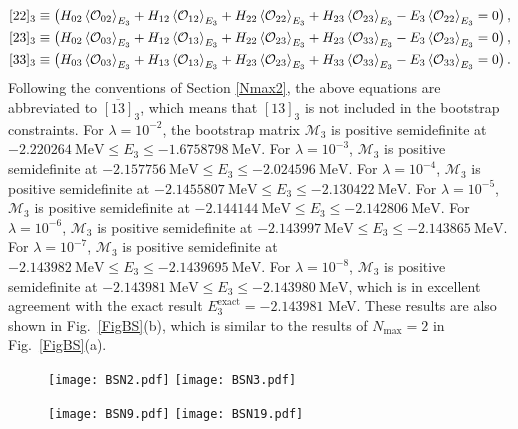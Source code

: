 \documentclass[aps,prc,reprint,superscriptaddress,nofootinbib]{revtex4-2}
\begin{document}
\begin{widetext}
\begin{align}
&[22]_3\equiv \left(H_{02}\braket{\mathcal{O}_{02}}_{E_3}+H_{12}\braket{\mathcal{O}_{12}}_{E_3}+H_{22}\braket{\mathcal{O}_{22}}_{E_3}+H_{23}\braket{\mathcal{O}_{23}}_{E_3}-E_3\braket{\mathcal{O}_{22}}_{E_3}=0\right),\nonumber\\
&[23]_3\equiv \left(H_{02}\braket{\mathcal{O}_{03}}_{E_3}+H_{12}\braket{\mathcal{O}_{13}}_{E_3}+H_{22}\braket{\mathcal{O}_{23}}_{E_3}+H_{23}\braket{\mathcal{O}_{33}}_{E_3}-E_3\braket{\mathcal{O}_{23}}_{E_3}=0\right),\nonumber\\
&[33]_3\equiv \left(H_{03}\braket{\mathcal{O}_{03}}_{E_3}+H_{13}\braket{\mathcal{O}_{13}}_{E_3}+H_{23}\braket{\mathcal{O}_{23}}_{E_3}+H_{33}\braket{\mathcal{O}_{33}}_{E_3}-E_3\braket{\mathcal{O}_{33}}_{E_3}=0\right).
\end{align}
Following the conventions of Section \ref{Nmax2}, the above equations are abbreviated to $\overline{[13]}_3$,
which means that $[13]_3$ is not included in the bootstrap constraints.
For $\lambda=10^{-2}$, the bootstrap matrix $\bm{\mathcal{M}}_3$ is positive semidefinite at $-2.220264\ \text{MeV}\leq E_3\leq-1.6758798\ \text{MeV}$. 
For $\lambda=10^{-3}$, $\bm{\mathcal{M}}_3$ is positive semidefinite at $-2.157756\ \text{MeV}\leq E_3\leq-2.024596\ \text{MeV}$. 
For $\lambda=10^{-4}$, $\bm{\mathcal{M}}_3$ is positive semidefinite at $-2.1455807\ \text{MeV}\leq E_3\leq-2.130422\ \text{MeV}$. 
For $\lambda=10^{-5}$, $\bm{\mathcal{M}}_3$ is positive semidefinite at $-2.144144\ \text{MeV}\leq E_3\leq-2.142806\ \text{MeV}$. 
For $\lambda=10^{-6}$, $\bm{\mathcal{M}}_3$ is positive semidefinite at $-2.143997\ \text{MeV}\leq E_3\leq-2.143865\ \text{MeV}$. 
For $\lambda=10^{-7}$, $\bm{\mathcal{M}}_3$ is positive semidefinite at $-2.143982\ \text{MeV}\leq E_3\leq-2.1439695\ \text{MeV}$. 
For $\lambda=10^{-8}$, $\bm{\mathcal{M}}_3$ is positive semidefinite at $-2.143981\ \text{MeV}\leq E_3\leq-2.143980\ \text{MeV}$,
which is in excellent agreement with the exact result $E_3^\text{exact}=-2.143981$ MeV. 
These results are also shown in Fig.~\ref{FigBS}(b),
which is similar to the results of $N_\text{max}=2$ in Fig.~\ref{FigBS}(a).

\begin{figure*}


  \texttt{[image: BSN2.pdf]}
  \texttt{[image: BSN3.pdf]}
    
  \texttt{[image: BSN9.pdf]}    
  \texttt{[image: BSN19.pdf]}


\end{figure*}
\end{widetext}
\end{document}
